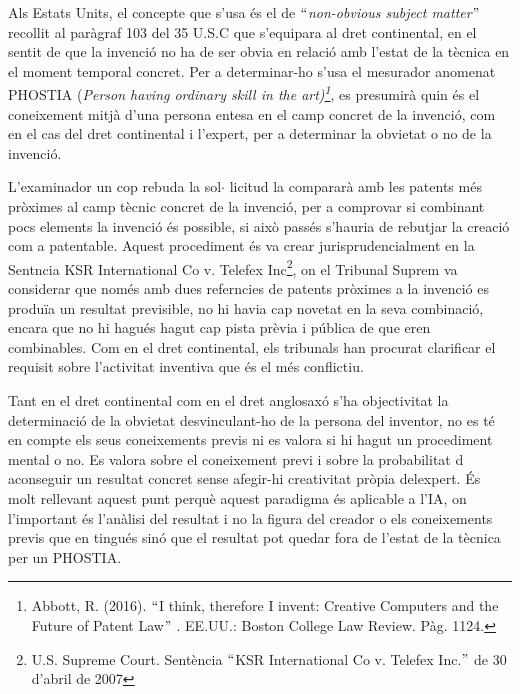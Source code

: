 \documentclass[12pt]{article}
\renewcommand{\_}{\kern-1.5pt\textunderscore\kern-1.5pt}
\begin{document}
\begin{itemize}
\vspace{\baselineskip}
Als Estats Units, el concepte que s’usa és el de $``$\textit{non-obvious subject matter$"$  }recollit al paràgraf 103 del 35 U.S.C que s’equipara al dret continental, en el sentit de que la invenció no ha de ser obvia en relació amb l’estat de la tècnica en el moment temporal concret. Per a determinar-ho s’usa el mesurador anomenat PHOSTIA (\textit{Person having ordinary skill in the art)\footnote{ Abbott, R. (2016). $``$I think, therefore I invent: Creative Computers and the Future of Patent Law$"$ . EE.UU.: Boston College Law Review. Pàg. 1124. }}, es presumirà quin és el coneixement mitjà d’una persona entesa en el camp concret de la invenció, com en el cas del dret continental i l’expert, per a determinar la obvietat o no de la invenció. \par


\vspace{\baselineskip}
L’examinador un cop rebuda la sol$ \cdot $ licitud la compararà amb les patents més pròximes al camp tècnic concret de la invenció, per a comprovar si combinant pocs elements la invenció és possible, si això passés s’hauria de rebutjar la creació com a patentable. Aquest procediment és va crear jurisprudencialment en la Sentncia KSR International Co v. Telefex Inc\footnote{ U.S. Supreme Court. Sentència $``$KSR International Co v. Telefex Inc.$"$  de 30 d’abril de 2007 }, on el Tribunal Suprem va considerar que només amb dues referncies  de patents pròximes a la invenció es produïa un resultat previsible, no hi havia cap novetat en la seva combinació, encara que no hi hagués hagut cap pista prèvia i pública de que eren combinables. Com en el dret continental, els tribunals han procurat clarificar el requisit sobre l’activitat inventiva que és el més conflictiu. \par


\vspace{\baselineskip}
Tant en el dret continental com en el dret anglosaxó s’ha objectivitat la determinació de la obvietat desvinculant-ho de la persona del inventor, no es té en compte els seus coneixements previs ni es valora si hi hagut un procediment mental o no. Es valora sobre el coneixement previ i sobre la probabilitat d aconseguir un resultat concret sense afegir-hi creativitat pròpia delexpert. És molt rellevant aquest punt perquè aquest paradigma és aplicable a l’IA, on l’important és l’anàlisi del resultat i no la figura del creador o els coneixements previs que en tingués sinó que el resultat pot quedar fora de l’estat de la tècnica per un PHOSTIA.\par



\end{itemize}
\end{document}
